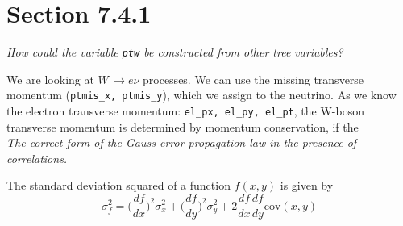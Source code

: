 \documentclass{article}
\begin{document}
\section{Section 7.4.1}
\textit{How could the variable \texttt{ptw} be constructed from other tree variables?}\\
\par We are looking at $W \, \rightarrow e \nu$ processes. We can use the missing transverse momentum (\texttt{ptmis\_x, ptmis\_y}), which we assign to the neutrino. As we know the electron transverse momentum: \texttt{el\_px, el\_py, el\_pt}, the W-boson transverse momentum is determined by momentum conservation, if the \\[14pt]
\textit{The correct form of the Gauss error propagation law in the presence of correlations.}\\
\par The standard deviation squared of a function $f(x,y)$ is given by
\begin{equation}
\sigma_f^2 = \Big(\frac{df}{dx}\Big)^2 \sigma_x^2 + \Big( \frac{df}{dy} \Big)^2 \sigma_y^2 + 2 \frac{df}{dx}\frac{df}{dy}\text{cov}(x,y)
\end{equation}
\end{document}
